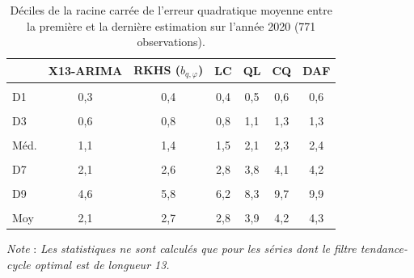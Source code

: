 \documentclass[
  11pt,
  french,
  a4paper]{article}
\newcommand\1{\mathds{1}}
\begin{document}
\begin{table}[!h]

\caption{\label{tab:covid-rev}Déciles de la racine carrée de l'erreur quadratique moyenne entre la première et la dernière estimation sur l'année 2020 (771 observations).}
\centering
\begin{tabular}[t]{lcccccc}
\toprule
  & X13-ARIMA & RKHS ($b_{q,\varphi}$) & LC & QL & CQ & DAF\\
\midrule
\cellcolor{gray!6}{Min} & \cellcolor{gray!6}{0,1} & \cellcolor{gray!6}{0,1} & \cellcolor{gray!6}{0,1} & \cellcolor{gray!6}{0,2} & \cellcolor{gray!6}{0,2} & \cellcolor{gray!6}{0,2}\\
D1 & 0,3 & 0,4 & 0,4 & 0,5 & 0,6 & 0,6\\
\cellcolor{gray!6}{D2} & \cellcolor{gray!6}{0,5} & \cellcolor{gray!6}{0,5} & \cellcolor{gray!6}{0,6} & \cellcolor{gray!6}{0,8} & \cellcolor{gray!6}{0,9} & \cellcolor{gray!6}{0,9}\\
D3 & 0,6 & 0,8 & 0,8 & 1,1 & 1,3 & 1,3\\
\cellcolor{gray!6}{D4} & \cellcolor{gray!6}{0,8} & \cellcolor{gray!6}{1,0} & \cellcolor{gray!6}{1,1} & \cellcolor{gray!6}{1,5} & \cellcolor{gray!6}{1,6} & \cellcolor{gray!6}{1,7}\\
\addlinespace
Méd. & 1,1 & 1,4 & 1,5 & 2,1 & 2,3 & 2,4\\
\cellcolor{gray!6}{D6} & \cellcolor{gray!6}{1,5} & \cellcolor{gray!6}{1,9} & \cellcolor{gray!6}{2,0} & \cellcolor{gray!6}{2,8} & \cellcolor{gray!6}{3,1} & \cellcolor{gray!6}{3,1}\\
D7 & 2,1 & 2,6 & 2,8 & 3,8 & 4,1 & 4,2\\
\cellcolor{gray!6}{D8} & \cellcolor{gray!6}{3,1} & \cellcolor{gray!6}{3,7} & \cellcolor{gray!6}{4,0} & \cellcolor{gray!6}{5,1} & \cellcolor{gray!6}{5,7} & \cellcolor{gray!6}{5,8}\\
D9 & 4,6 & 5,8 & 6,2 & 8,3 & 9,7 & 9,9\\
\addlinespace
\cellcolor{gray!6}{Max} & \cellcolor{gray!6}{25,0} & \cellcolor{gray!6}{36,6} & \cellcolor{gray!6}{41,0} & \cellcolor{gray!6}{54,8} & \cellcolor{gray!6}{55,2} & \cellcolor{gray!6}{52,9}\\
Moy & 2,1 & 2,7 & 2,8 & 3,9 & 4,2 & 4,3\\
\bottomrule
\end{tabular}
\footnotesize


\emph{Note} : \emph{Les statistiques ne sont calculés que pour les séries dont le filtre tendance-cycle optimal est de longueur 13.}
\normalsize\end{table}
\end{document}
